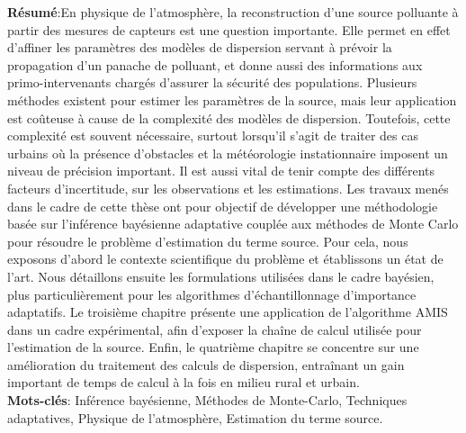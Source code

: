 {\small \textbf{Résumé}:En physique de l’atmosphère, la reconstruction d’une source polluante à partir des mesures de capteurs est une question importante. Elle permet en effet d’affiner les paramètres des modèles de dispersion servant à prévoir la propagation d’un panache de polluant, et donne aussi des informations aux primo-intervenants chargés d’assurer la sécurité des populations.
Plusieurs méthodes existent pour estimer les paramètres de la source, mais leur application est coûteuse à cause de la complexité des modèles de dispersion. Toutefois, cette complexité est souvent nécessaire, surtout lorsqu’il s’agit de traiter des cas urbains où la présence d’obstacles et la météorologie instationnaire imposent un niveau de précision important. Il est aussi vital de tenir compte des différents facteurs d’incertitude, sur les observations et les estimations.
Les travaux menés dans le cadre de cette thèse ont pour objectif de développer une méthodologie basée sur l’inférence bayésienne adaptative couplée aux méthodes de Monte Carlo pour résoudre le problème d’estimation du terme source. Pour cela, nous exposons d’abord le contexte scientifique du problème et établissons un état de l’art. Nous détaillons ensuite les formulations utilisées dans le cadre bayésien, plus particulièrement pour les algorithmes d’échantillonnage d’importance adaptatifs. Le troisième chapitre présente une application de l’algorithme AMIS dans un cadre expérimental, afin d’exposer la chaîne de calcul utilisée pour l’estimation de la source. Enfin, le quatrième chapitre se concentre sur une amélioration du traitement des calculs de dispersion, entraînant un gain important de temps de calcul à la fois en milieu rural et urbain.\\

\textbf{Mots-clés}: Inférence bayésienne, Méthodes de Monte-Carlo, Techniques adaptatives, Physique de l'atmosphère, Estimation du terme source. \\

}

